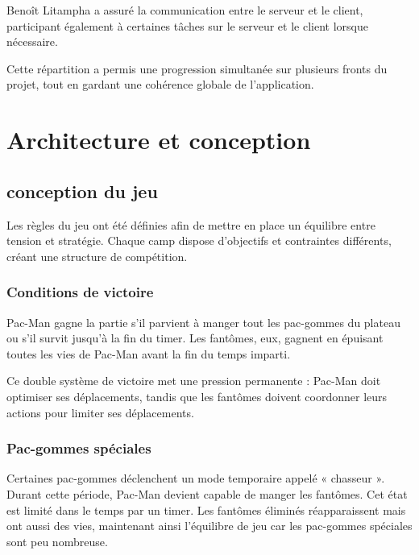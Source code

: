 \documentclass[a4paper, 11pt]{report}
\begin{document}
Benoît Litampha a assuré la communication entre le serveur et le client, participant également à certaines tâches sur le serveur et le client lorsque nécessaire. 

Cette répartition a permis une progression simultanée sur plusieurs fronts du projet, tout en gardant une cohérence globale de l’application.



\chapter{Architecture et conception}

\section{conception du jeu}

Les règles du jeu ont été définies afin de mettre en place un équilibre entre tension et stratégie.
Chaque camp dispose d’objectifs et contraintes différents, créant une structure de compétition.

\subsection{Conditions de victoire}

Pac-Man gagne la partie s’il parvient à manger tout les pac-gommes du plateau ou s’il survit jusqu’à la fin du timer. 
Les fantômes, eux, gagnent en épuisant toutes les vies de Pac-Man avant la fin du temps imparti.

Ce double système de victoire met une pression permanente : Pac-Man doit optimiser ses déplacements, tandis que les fantômes doivent coordonner leurs actions pour limiter ses déplacements.

\subsection{Pac-gommes spéciales}

Certaines pac-gommes déclenchent un mode temporaire appelé « chasseur ».
Durant cette période, Pac-Man devient capable de manger les fantômes.
Cet état est limité dans le temps par un timer.
Les fantômes éliminés réapparaissent mais ont aussi des vies, maintenant ainsi l’équilibre de jeu car les pac-gommes spéciales sont peu nombreuse.
\end{document}
